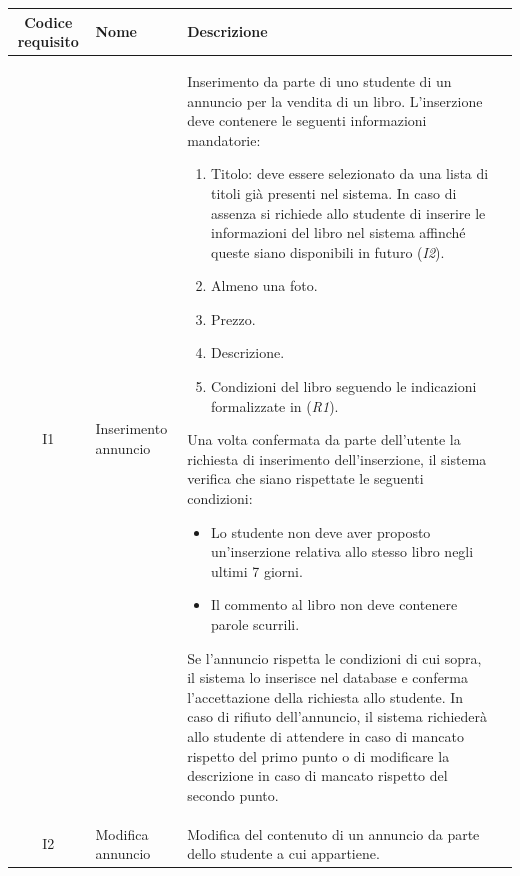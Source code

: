 \documentclass[10pt,a4paper]{report}
\begin{document}
	\begin{tabular}{cp{3cm}p{9cm}p{1cm}}
		Codice requisito&Nome&Descrizione\\ \hline
		I1&Inserimento annuncio&Inserimento da parte di uno studente di un annuncio per la vendita di un libro. L'inserzione deve contenere le seguenti informazioni mandatorie:
		\begin{enumerate}
			\item Titolo: deve essere selezionato da una lista di titoli già presenti nel sistema. In caso di assenza si richiede allo studente di inserire le informazioni del libro nel sistema affinché queste siano disponibili in futuro (\textit{I2}).
			\item Almeno una foto.
			\item Prezzo.
			\item Descrizione.	
			\item Condizioni del libro seguendo le indicazioni formalizzate in (\textit{R1}).
		\end{enumerate}
		Una volta confermata da parte dell'utente la richiesta di inserimento dell'inserzione, il sistema verifica che siano rispettate le seguenti condizioni:
		\begin{itemize}
			\item Lo studente non deve aver proposto un'inserzione relativa allo stesso libro negli ultimi 7 giorni.
			\item Il commento al libro non deve contenere parole scurrili.
		\end{itemize}
		Se l'annuncio rispetta le condizioni di cui sopra, il sistema lo inserisce nel database e conferma l'accettazione della richiesta allo studente. In caso di rifiuto dell'annuncio, il sistema richiederà allo studente di attendere in caso di mancato rispetto del primo punto o di modificare la descrizione in caso di mancato rispetto del secondo punto.\\ \hline
		I2&Modifica annuncio&Modifica del contenuto di un annuncio da parte dello studente a cui appartiene.\\ \hline
	\end{tabular}
	\newpage
\end{document}
